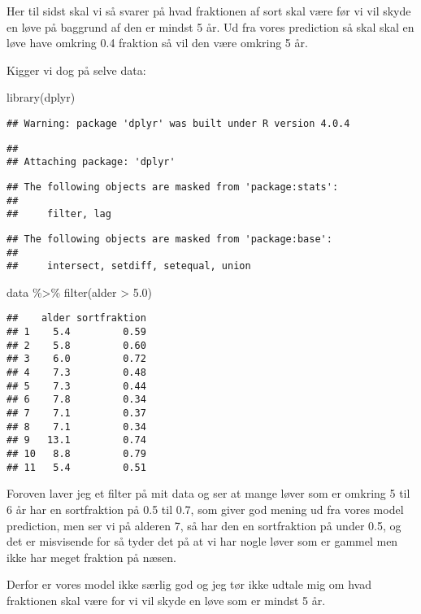 \documentclass[
]{article}
\newenvironment{Shaded}{\begin{snugshade}}{\end{snugshade}}
\newcommand{\FloatTok}[1]{\textcolor[rgb]{0.00,0.00,0.81}{#1}}
\newcommand{\FunctionTok}[1]{\textcolor[rgb]{0.00,0.00,0.00}{#1}}
\newcommand{\NormalTok}[1]{#1}
\newcommand{\SpecialCharTok}[1]{\textcolor[rgb]{0.00,0.00,0.00}{#1}}
\begin{document}
Her til sidst skal vi så svarer på hvad fraktionen af sort skal være før
vi vil skyde en løve på baggrund af den er mindst 5 år. Ud fra vores
prediction så skal skal en løve have omkring 0.4 fraktion så vil den
være omkring 5 år.

Kigger vi dog på selve data:

\begin{Shaded}
\begin{Highlighting}[]
\FunctionTok{library}\NormalTok{(dplyr)}
\end{Highlighting}
\end{Shaded}

\begin{verbatim}
## Warning: package 'dplyr' was built under R version 4.0.4
\end{verbatim}

\begin{verbatim}
## 
## Attaching package: 'dplyr'
\end{verbatim}

\begin{verbatim}
## The following objects are masked from 'package:stats':
## 
##     filter, lag
\end{verbatim}

\begin{verbatim}
## The following objects are masked from 'package:base':
## 
##     intersect, setdiff, setequal, union
\end{verbatim}

\begin{Shaded}
\begin{Highlighting}[]
\NormalTok{data }\SpecialCharTok{\%\textgreater{}\%} 
  \FunctionTok{filter}\NormalTok{(alder }\SpecialCharTok{\textgreater{}} \FloatTok{5.0}\NormalTok{)}
\end{Highlighting}
\end{Shaded}

\begin{verbatim}
##    alder sortfraktion
## 1    5.4         0.59
## 2    5.8         0.60
## 3    6.0         0.72
## 4    7.3         0.48
## 5    7.3         0.44
## 6    7.8         0.34
## 7    7.1         0.37
## 8    7.1         0.34
## 9   13.1         0.74
## 10   8.8         0.79
## 11   5.4         0.51
\end{verbatim}

Foroven laver jeg et filter på mit data og ser at mange løver som er
omkring 5 til 6 år har en sortfraktion på 0.5 til 0.7, som giver god
mening ud fra vores model prediction, men ser vi på alderen 7, så har
den en sortfraktion på under 0.5, og det er misvisende for så tyder det
på at vi har nogle løver som er gammel men ikke har meget fraktion på
næsen.

Derfor er vores model ikke særlig god og jeg tør ikke udtale mig om hvad
fraktionen skal være for vi vil skyde en løve som er mindst 5 år.
\end{document}
